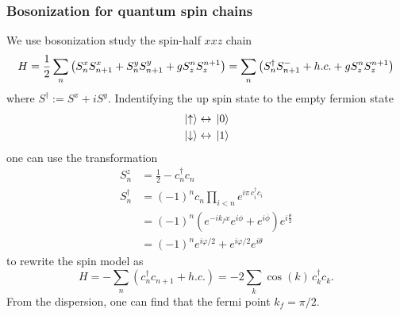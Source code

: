 \subsubsection{Bosonization for quantum spin chains}
We use bosonization study the spin-half $xxz$ chain
\begin{equation}
	H = \frac{1}{2}\sum_n \left(S_n^x S_{n+1}^x + S_n^y S_{n+1}^y + g S^{n}_{z} S^{n+1}_{z} \right) = \sum_n \left(S^\dagger_n S^{-}_{n+1} + h.c. + g S^{n}_{z} S^{n+1}_{z} \right)
\end{equation}
where $S^\dagger := S^x + i S^y$. Indentifying the up spin state to the empty fermion state
\begin{equation}
	\begin{aligned}
		&\ket*{\uparrow} \leftrightarrow \ket*{0}\\
		&\ket*{\downarrow} \leftrightarrow \ket*{1}
	\end{aligned}
\end{equation}
one can use the transformation
\begin{equation}
	\begin{aligned}
		S_n^z &= \frac{1}{2} - c_n^\dagger c_n \\
		S_n^\dagger &= \left(-1\right)^n c_n \prod_{i<n}e^{i\pi\,c_i^\dagger c_i} \\
		&= (-1)^n \left( e^{-ik_f x} e^{i\phi} + e^{i\overline{\phi}}\right) e^{i\frac{\theta}{2}} \\
		&= (-1)^n e^{i\varphi/2} + e^{i\varphi/2} e^{i\theta}
	\end{aligned}
\end{equation}
to rewrite the spin model as 
\begin{equation}
	H = -\sum_n \left(c_n^\dagger c_{n+1} + h.c.\right) = -2\sum_k \cos(k)\,c_k^\dagger c_k.
\end{equation}
From the dispersion, one can find that the fermi point $k_f = \pi/2$. 

